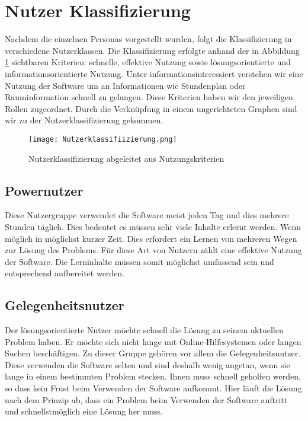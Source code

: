 \section{Nutzer Klassifizierung}
Nachdem die einzelnen Personas vorgestellt wurden, folgt die Klassifizierung in verschiedene Nutzerklassen. Die Klassifizierung erfolgte anhand der in Abbildung \ref{img1:userRoles} sichtbaren Kriterien: schnelle, effektive Nutzung sowie lösungsorientierte und informationsorientierte Nutzung. Unter informationsinteressiert verstehen wir eine Nutzung der Software um an Informationen wie Stundenplan oder Rauminformation schnell zu gelangen. Diese Kriterien haben wir den jeweiligen Rollen zugeordnet. Durch die Verknüpfung in einem ungerichteten Graphen sind wir zu der Nutzerklassifizierung gekommen.
\begin{figure}[ht]
\begin{center}
\texttt{[image: Nutzerklassifiizierung.png]}
\caption{Nutzerklassifizierung abgeleitet aus Nutzungskriterien}
\label{img1:userRoles}
\end{center}
\end{figure} 
\subsection{Powernutzer}
Diese Nutzergruppe verwendet die Software meist jeden Tag und dies mehrere Stunden täglich. Dies bedeutet es müssen sehr viele Inhalte erlernt werden. Wenn möglich in möglichst kurzer Zeit. Dies erfordert ein Lernen von mehreren Wegen zur Lösung des Problems. Für diese Art von Nutzern zählt eine effektive Nutzung der Software. Die Lerninhalte müssen somit möglichst umfassend sein und entsprechend aufbereitet werden. 

\subsection{Gelegenheitsnutzer}
Der lösungsorientierte Nutzer möchte schnell die Lösung zu seinem aktuellen Problem haben. Er möchte sich nicht lange mit Online-Hilfesystemen oder langen Suchen beschäftigen. Zu dieser Gruppe gehören vor allem die Gelegenheitsnutzer. Diese verwenden die Software selten und sind deshalb wenig angetan, wenn sie lange in einem bestimmten Problem stecken. Ihnen muss schnell geholfen werden, so dass kein Frust beim Verwenden der Software aufkommt. Hier läuft die Lösung nach dem Prinzip ab, dass ein Problem beim Verwenden der Software auftritt und schnellstmöglich eine Lösung her muss. 

